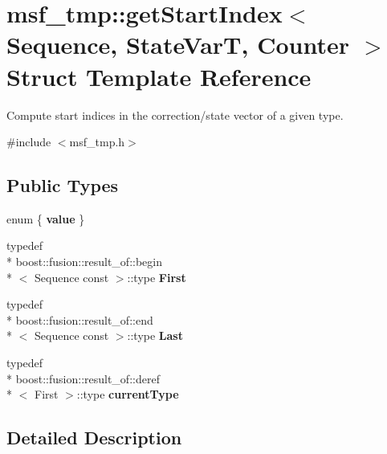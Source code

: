 \hypertarget{structmsf__tmp_1_1getStartIndex}{\section{msf\-\_\-tmp\-:\-:get\-Start\-Index$<$ Sequence, State\-Var\-T, Counter $>$ Struct Template Reference}
\label{structmsf__tmp_1_1getStartIndex}
}


Compute start indices in the correction/state vector of a given type.  




{\ttfamily \#include $<$msf\-\_\-tmp.\-h$>$}

\subsection*{Public Types}
\begin{DoxyCompactItemize}
\item 
enum \{ {\bfseries value}
 \}
\item 
\hypertarget{structmsf__tmp_1_1getStartIndex_a1cc5754b8602cfbd8e61f73cff974a6b}{typedef \\*
boost\-::fusion\-::result\-\_\-of\-::begin\\*
$<$ Sequence const  $>$\-::type {\bfseries First}}\label{structmsf__tmp_1_1getStartIndex_a1cc5754b8602cfbd8e61f73cff974a6b}

\item 
\hypertarget{structmsf__tmp_1_1getStartIndex_ab21b8aa838fc319c251de994cb353f97}{typedef \\*
boost\-::fusion\-::result\-\_\-of\-::end\\*
$<$ Sequence const  $>$\-::type {\bfseries Last}}\label{structmsf__tmp_1_1getStartIndex_ab21b8aa838fc319c251de994cb353f97}

\item 
\hypertarget{structmsf__tmp_1_1getStartIndex_a53bb8aad63f0647cd38ebd138fb065ea}{typedef \\*
boost\-::fusion\-::result\-\_\-of\-::deref\\*
$<$ First $>$\-::type {\bfseries current\-Type}}\label{structmsf__tmp_1_1getStartIndex_a53bb8aad63f0647cd38ebd138fb065ea}

\end{DoxyCompactItemize}


\subsection{Detailed Description}
